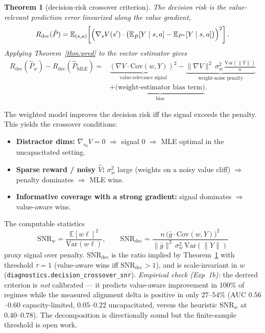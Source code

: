 \documentclass[11pt]{article}
\newtheorem{theorem}{Theorem}
\begin{document}
\begin{theorem}[decision-risk crossover criterion]
\label{thm:crossover}
The \emph{decision} risk is the value-relevant prediction error linearized along the
value gradient,
\begin{equation}
  R_{\mathrm{dec}}(\hat{P})
    = \mathbb{E}_{(s,a)}\!\left[
      \Bigl( \nabla_s V(s') \cdot 
        \bigl( \mathbb{E}_{\hat{P}}[Y \mid s,a] - \mathbb{E}_{P^*}[Y \mid s,a] \bigr)
      \Bigr)^2
    \right].
\end{equation}
Applying Theorem~\ref{thm:pred} to the vector estimator gives
\begin{equation}
\begin{aligned}
  R_{\mathrm{dec}}(\hat{P}_w) - R_{\mathrm{dec}}(\hat{P}_{\mathrm{MLE}})
  ={}& \underbrace{\left(\nabla V \cdot \mathrm{Cov}(w, Y)\right)^2}_{\text{value-relevance signal}}
      - \underbrace{\lVert \nabla V\rVert^2\, \sigma_w^2\,
        \frac{\mathrm{Var}(\lVert Y\rVert)}{n}}_{\text{weight-noise penalty}} \\
     &+ \underbrace{\text{(weight-estimator bias term)}}_{\text{bias}}.
\end{aligned}
\end{equation}
\end{theorem}

The weighted model improves the decision risk iff the signal exceeds the penalty. This
yields the crossover conditions:
\begin{itemize}
\item \textbf{Distractor dims:} $\nabla_{s_d} V = 0$ $\Rightarrow$ signal $0$
  $\Rightarrow$ MLE optimal in the uncapacitated setting.
\item \textbf{Sparse reward / noisy $\hat{V}$:} $\sigma_w^2$ large (weights on a noisy
  value cliff) $\Rightarrow$ penalty dominates $\Rightarrow$ MLE wins.
\item \textbf{Informative coverage with a strong gradient:} signal dominates
  $\Rightarrow$ value-aware wins.
\end{itemize}

The computable statistics
\begin{equation}
  \mathrm{SNR}_w = \frac{\mathbb{E}[w\ell]^2}{\mathrm{Var}(w\ell)},
  \qquad
  \mathrm{SNR}_{\mathrm{dec}} = \frac{n\,\bigl(\bar g \cdot \mathrm{Cov}(w, Y)\bigr)^2}
    {\lVert \bar g\rVert^2\, \sigma_w^2\, \mathrm{Var}(\lVert Y\rVert)}
\end{equation}
proxy signal over penalty. $\mathrm{SNR}_{\mathrm{dec}}$ is the ratio implied by
Theorem~\ref{thm:crossover} with threshold $\tau = 1$ (value-aware wins iff
$\mathrm{SNR}_{\mathrm{dec}} > 1$), and is scale-invariant in $w$
(\texttt{diagnostics.decision\_crossover\_snr}). \emph{Empirical check (Exp~1b):} the
derived criterion is \emph{not} calibrated --- it predicts value-aware improvement in
$100\%$ of regimes while the measured alignment delta is positive in only $27$--$54\%$
(AUC $0.56$--$0.60$ capacity-limited, $0.05$--$0.22$ uncapacitated, versus the heuristic
$\mathrm{SNR}_w$ at $0.40$--$0.78$). The decomposition is directionally sound but the
finite-sample threshold is open work.
\end{document}
